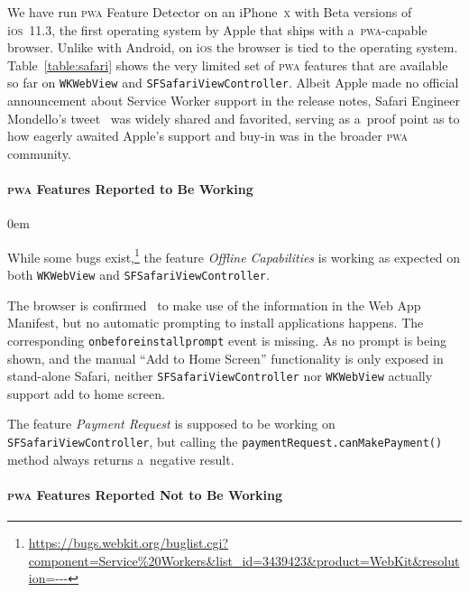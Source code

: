 \documentclass[sigconf,hyphens]{acmart}
\begin{document}
We have run \textsc{pwa} Feature Detector on an iPhone~\textsc{x}
with Beta versions of i\textsc{os}~11.3,
the first operating system by Apple that ships with a~\textsc{pwa}-capable browser.
Unlike with Android, on i\textsc{os} the browser is tied to the operating system.
Table~\ref{table:safari} shows the very limited set of \textsc{pwa} features
that are available so far on \texttt{WKWebView} and \texttt{SFSafariViewController}.
Albeit Apple made no official announcement about Service Worker support in the release notes,
Safari Engineer Mondello's tweet~\cite{mondello2018safari} was widely shared and favorited,
serving as a~proof point as to how eagerly awaited Apple's support and buy-in
was in the broader \textsc{pwa} community.

\paragraph{\textsc{pwa} Features Reported to Be Working}

\begin{description}
  \itemsep0em 
  \item[Offline Capabilities] While some bugs
    exist,\footnote{\url{https://bugs.webkit.org/buglist.cgi?component=Service\%20Workers&list_id=3439423&product=WebKit&resolution=---}} the feature \emph{Offline Capabilities}
    is working as expected on both \texttt{WKWebView} and \texttt{SFSafariViewController}.
  \item[Add to Home Screen] The browser is confirmed~\cite{mondello2018safari}
    to make use of the information in the Web App Manifest,
    but no automatic prompting to install applications happens.
    The corresponding \texttt{onbeforeinstallprompt} event is missing.
    As no prompt is being shown, and the manual ``Add to Home Screen'' functionality
    is only exposed in stand-alone Safari, neither \texttt{SFSafariViewController} nor \texttt{WKWebView}
    actually support add to home screen.
  \item[Payment Request] The feature \emph{Payment Request} is supposed
    to be working on \texttt{SFSafariViewController}, but calling the \texttt{paymentRequest.canMakePayment()}
    method always returns a~negative result.
\end{description} 

\paragraph{\textsc{pwa} Features Reported Not to Be Working} \leavevmode \newline
\end{document}
